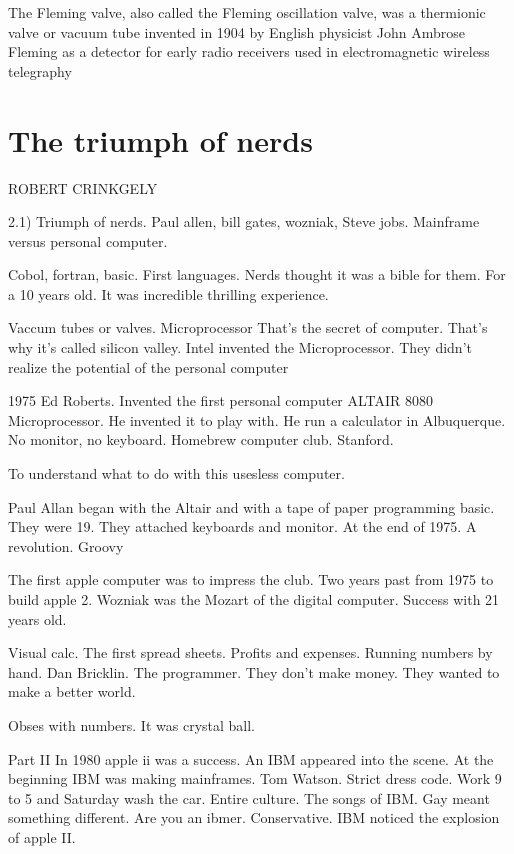   The Fleming valve, also called the Fleming oscillation valve, was a thermionic valve or vacuum tube invented in 1904 by English physicist 
  John Ambrose Fleming as a detector for early radio receivers used in electromagnetic wireless telegraphy
  
 
  \section{The triumph of nerds}
  ROBERT CRINKGELY
  
  2.1) Triumph of nerds. Paul allen, bill gates, wozniak, Steve jobs. 
  Mainframe versus personal computer. 
  
  Cobol, fortran, basic. First languages. 
  Nerds thought it was a bible for them. For a 10 years old. It was incredible thrilling experience. 
  
  Vaccum tubes or valves. Microprocessor That's the secret of computer. That's why it's called silicon valley. Intel invented the 
  Microprocessor. 
  They didn't realize the potential of the personal computer
  
  
  
  
  1975 Ed Roberts. Invented the first personal computer ALTAIR 8080 Microprocessor. He invented it to play with. He run a calculator in 
  Albuquerque. No monitor, no keyboard. Homebrew computer club. Stanford. 
  
  To understand what to do with this usesless computer. 
  
  Paul Allan began with the Altair and with a tape of paper programming basic. They were 19. They attached keyboards and monitor. At the end 
  of 1975. A revolution. Groovy
  
  The first apple computer was to impress the club. 
  Two years past from 1975 to build apple 2. Wozniak was the Mozart of the digital computer. 
  Success with 21 years old. 
  
  Visual calc. The first spread sheets.  Profits and expenses. Running numbers by hand. Dan Bricklin. The programmer. They don't make money. 
  They wanted to make a better world. 
  
  Obses with numbers. It was crystal ball. 
  
  Part II
  In 1980 apple ii was a success. An IBM appeared into the scene. At the beginning IBM was making mainframes. Tom Watson. Strict dress code. 
  Work 9 to 5 and Saturday wash the car. Entire culture. The songs of IBM. Gay meant something different. Are you an ibmer. Conservative. IBM 
  noticed the explosion of apple II. 
  
